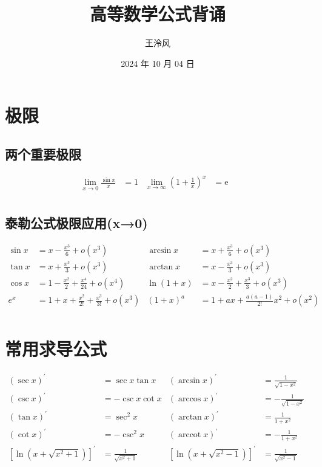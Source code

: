﻿\documentclass[a4paper,12pt,UTF8]{ctexart}
\begin{document}
    \title{高等数学公式背诵}
    \author{王泠风}
    \date{2024 年 10 月 04 日}
    \maketitle

    \section{极限}

    \subsection{两个重要极限}
    \begin{align*}
        \lim_{x\to 0}\frac{\sin x}{x}& = 1& \lim_{x\to\infty}\left(1+\frac{1}{x}\right)^x& = \mathrm{e}&\\
    \end{align*}
    
    \subsection{泰勒公式极限应用(x→0)}
    \begin{align*}
        \sin x& = x - \frac{x^{3}}{6} + o(x^{3})& \arcsin x& = x + \frac{x^{3}}{6} + o(x^{3})&\\
        \tan x& = x + \frac{x^{3}}{3} + o(x^{3})& \arctan x& = x - \frac{x^{3}}{3} + o(x^{3})&\\
        \cos x& = 1 - \frac{x^{2}}{2} + \frac{x^{4}}{24} + o(x^{4})& \ln (1+x)& = x - \frac{x^{2}}{2} + \frac{x^{3}}{3} + o(x^{3})&\\
        e^x& = 1 + x + \frac{x^{2}}{2!} + \frac{x^{3}}{3!} + o(x^{3})& (1+x)^{a}& = 1 + ax + \frac{a(a-1)}{2!}x^{2} + o(x^{2})&\\
    \end{align*}

    \section{常用求导公式}
    \begin{align*}
        (\sec x)^{'}& = \sec x\tan x& (\arcsin x)^{'}& = \frac{1}{\sqrt{1-x^{2}}}&\\
        (\csc x)^{'}& = -\csc x\cot x& (\arccos x)^{'}& = -\frac{1}{\sqrt{1-x^{2}}}&\\
        (\tan x)^{'}& = \sec^{2}x& (\arctan x)^{'}& = \frac{1}{1+x^{2}}&\\
        (\cot x)^{'}& = -\csc^{2}x& (\operatorname{arccot} x)^{'}& = -\frac{1}{1+x^{2}}&\\
        [\ln(x+\sqrt{x^{2}+1})]^{'}& = \frac{1}{\sqrt{x^{2}+1}}& [\ln(x+\sqrt{x^{2}-1})]^{'}& = \frac{1}{\sqrt{x^{2}-1}}&\\
    \end{align*}
\end{document}
